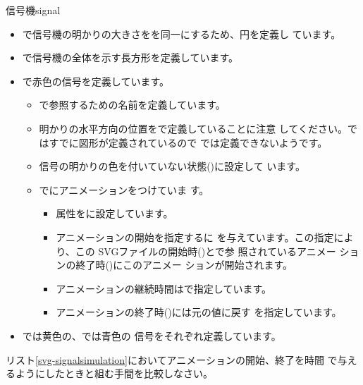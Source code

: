 {信号機}{signal} 
{}
\begin{itemize}
 \item {}で信号機の明かりの大きさをを同一にするため、円を定義し
       ています。
 \item {}で信号機の全体を示す長方形を定義しています。
 \item {}で赤色の信号を定義しています。
\begin{itemize}
 \item {}で参照するための名前を定義しています。
 \item 明かりの水平方向の位置をで定義していることに注意
       してください。ではすでに図形が定義されているので
       では定義できないようです。
 \item 信号の明かりの色を付いていない状態()に設定して
       います。
 \item {}でにアニメーションをつけていま
       す。
\begin{itemize}
 \item 属性をに設定しています。
 \item アニメーションの開始を指定するに
       を与えています。この指定により、この
       SVGファイルの開始時()とで参
       照されているアニメー ションの終了時()にこのアニメー
       ションが開始されます。
 \item アニメーションの継続時間はで指定しています。
 \item アニメーションの終了時()には元の値に戻す
       を指定しています。
\end{itemize}
\end{itemize}
 \item {}では黄色の、では青色の
       信号をそれぞれ定義しています。
\end{itemize}
\begin{Problem}\upshape
リスト\ref{svg-signalsimulation}においてアニメーションの開始、終了を時間
 で与えるようにしたときと組む手間を比較しなさい。
\end{Problem}
%
\fi